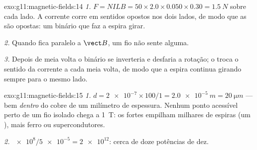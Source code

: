 \begin{solution}{exo:g11:magnetic-fields:14}
\emph{1.} $F = NILB = 50 \times 2.0 \times 0.050 \times 0.30 =
\qty{1.5}{N}$ sobre cada lado. A corrente corre em sentidos opostos nos
dois lados, de modo que as  são opostas: um binário que faz a
espira girar.

\emph{2.} Quando fica paralelo a $\vect B$, um fio não sente  alguma.

\emph{3.} Depois de meia volta o binário se inverteria e desfaria a
rotação; o  troca o sentido da corrente a cada meia volta, de
modo que a espira continua girando sempre para o mesmo lado.
\end{solution}

\begin{solution}{exo:g11:magnetic-fields:15}
\emph{1.} $d = \num{2e-7} \times 100 / 1 = \qty{2.0e-5}{m} =
\qty{20}{\micro m}$ --- bem \emph{dentro} do cobre de um milímetro de
espessura. Nenhum ponto acessível perto de um fio isolado chega a
\qty{1}{T}: os  fortes empilham milhares de espiras (um
), mais ferro ou supercondutores.

\emph{2.} $\num{e8} / \num{5e-5} = \num{2e12}$: cerca de doze potências
de dez.
\end{solution}

